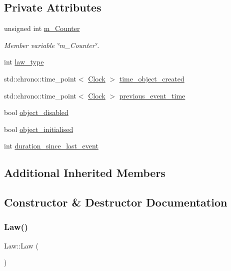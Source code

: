 \subsection*{Private Attributes}
\begin{DoxyCompactItemize}
\item 
unsigned int \mbox{\hyperlink{classLaw_a5d0e4fe1c614b9dac57f5f0135148cd6}{m\+\_\+\+Counter}}
\begin{DoxyCompactList}\small\item\em Member variable \char`\"{}m\+\_\+\+Counter\char`\"{}. \end{DoxyCompactList}\item 
int \mbox{\hyperlink{classLaw_a89176462e467ae7fa48c9b9cce6e55b2}{law\+\_\+type}}
\item 
std\+::chrono\+::time\+\_\+point$<$ \mbox{\hyperlink{universe_8h_a0ef8d951d1ca5ab3cfaf7ab4c7a6fd80}{Clock}} $>$ \mbox{\hyperlink{classLaw_a454bec5c547ef7482f1ec17259fb5af3}{time\+\_\+object\+\_\+created}}
\item 
std\+::chrono\+::time\+\_\+point$<$ \mbox{\hyperlink{universe_8h_a0ef8d951d1ca5ab3cfaf7ab4c7a6fd80}{Clock}} $>$ \mbox{\hyperlink{classLaw_a975eb41929cb9b4f216809889bfcb380}{previous\+\_\+event\+\_\+time}}
\item 
bool \mbox{\hyperlink{classLaw_ae0f326365accd025499b12cb0a9cb785}{object\+\_\+disabled}}
\item 
bool \mbox{\hyperlink{classLaw_abe7d645ce2c940fecdbbf7308ab9b2e8}{object\+\_\+initialised}}
\item 
int \mbox{\hyperlink{classLaw_a347aff85a02895946ff97718afdfeeff}{duration\+\_\+since\+\_\+last\+\_\+event}}
\end{DoxyCompactItemize}
\subsection*{Additional Inherited Members}


\subsection{Constructor \& Destructor Documentation}
\mbox{\label{classLaw_a3b94b6e9f09b8f457dba70f3b1c1ab43}} 
\subsubsection{\texorpdfstring{Law()}{Law()}\hspace{0.1cm}{\footnotesize\ttfamily [1/4]}}
{\footnotesize\ttfamily Law\+::\+Law (\begin{DoxyParamCaption}{ }\end{DoxyParamCaption})\hspace{0.3cm}{\ttfamily [inline]}}

